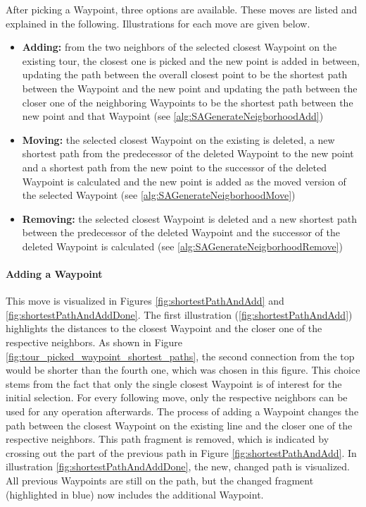 After picking a Waypoint, three options are available.
These moves are listed and explained in the following.
Illustrations for each move are given below.


\begin{itemize}
	\item \textbf{Adding:} from the two neighbors of the selected closest Waypoint on the existing tour, the closest one is picked and the new point is added in between, updating the path between the overall closest point to be the shortest path between the Waypoint and the new point and updating the path between the closer one of the neighboring Waypoints to be the shortest path between the new point and that Waypoint (see \ref{alg:SAGenerateNeigborhoodAdd})
	\item \textbf{Moving:} the selected closest Waypoint on the existing is deleted, a new shortest path from the predecessor of the deleted Waypoint to the new point and a shortest path from the new point to the successor of the deleted Waypoint is calculated and the new point is added as the moved version of the selected Waypoint (see \ref{alg:SAGenerateNeigborhoodMove})
	\item \textbf{Removing:} the selected closest Waypoint is deleted and a new shortest path between the predecessor of the deleted Waypoint and the successor of the deleted Waypoint is calculated (see \ref{alg:SAGenerateNeigborhoodRemove})
\end{itemize}


\paragraph{Adding a Waypoint}
This move is visualized in Figures \ref{fig:shortestPathAndAdd} and \ref{fig:shortestPathAndAddDone}.
The first illustration (\ref{fig:shortestPathAndAdd}) highlights the distances to the closest Waypoint and the closer one of the respective neighbors.
As shown in Figure \ref{fig:tour_picked_waypoint_shortest_paths}, the second connection from the top would be shorter than the fourth one, which was chosen in this figure.
This choice stems from the fact that only the single closest Waypoint is of interest for the initial selection. 
For every following move, only the respective neighbors can be used for any operation afterwards.
The process of adding a Waypoint changes the path between the closest Waypoint on the existing line and the closer one of the respective neighbors. 
This path fragment is removed, which is indicated by crossing out the part of the previous path in Figure \ref{fig:shortestPathAndAdd}.
In illustration \ref{fig:shortestPathAndAddDone}, the new, changed path is visualized.
All previous Waypoints are still on the path, but the changed fragment (highlighted in blue) now includes the additional Waypoint.

